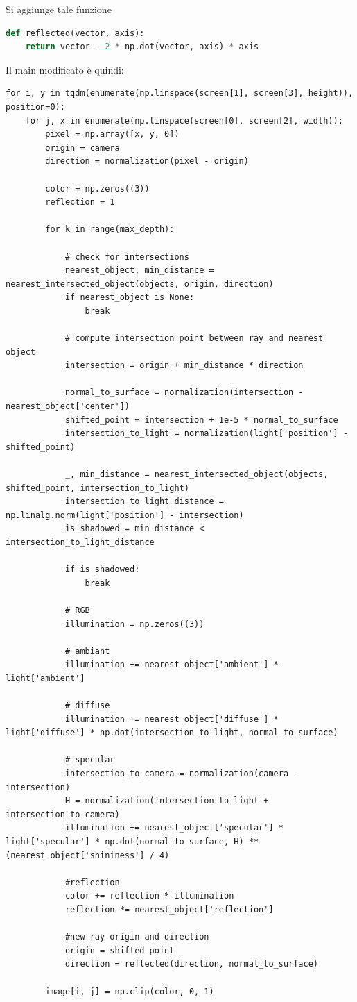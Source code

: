 \documentclass[9pt,a4paper,twoside]{tau}
\begin{document}
Si aggiunge tale funzione
\begin{lstlisting}[language=Python]
def reflected(vector, axis):
    return vector - 2 * np.dot(vector, axis) * axis
\end{lstlisting}
Il main modificato è quindi:
\begin{lstlisting}
for i, y in tqdm(enumerate(np.linspace(screen[1], screen[3], height)), position=0):
    for j, x in enumerate(np.linspace(screen[0], screen[2], width)):
        pixel = np.array([x, y, 0])
        origin = camera
        direction = normalization(pixel - origin)

        color = np.zeros((3))
        reflection = 1

        for k in range(max_depth):

            # check for intersections
            nearest_object, min_distance = nearest_intersected_object(objects, origin, direction)
            if nearest_object is None:
                break

            # compute intersection point between ray and nearest object
            intersection = origin + min_distance * direction

            normal_to_surface = normalization(intersection - nearest_object['center'])
            shifted_point = intersection + 1e-5 * normal_to_surface
            intersection_to_light = normalization(light['position'] - shifted_point)

            _, min_distance = nearest_intersected_object(objects, shifted_point, intersection_to_light)
            intersection_to_light_distance = np.linalg.norm(light['position'] - intersection)
            is_shadowed = min_distance < intersection_to_light_distance
            
            if is_shadowed:
                break

            # RGB
            illumination = np.zeros((3))

            # ambiant
            illumination += nearest_object['ambient'] * light['ambient']

            # diffuse
            illumination += nearest_object['diffuse'] * light['diffuse'] * np.dot(intersection_to_light, normal_to_surface)

            # specular
            intersection_to_camera = normalization(camera - intersection)
            H = normalization(intersection_to_light + intersection_to_camera)
            illumination += nearest_object['specular'] * light['specular'] * np.dot(normal_to_surface, H) ** (nearest_object['shininess'] / 4)

            #reflection
            color += reflection * illumination
            reflection *= nearest_object['reflection']

            #new ray origin and direction
            origin = shifted_point
            direction = reflected(direction, normal_to_surface)

        image[i, j] = np.clip(color, 0, 1)
\end{lstlisting}
\end{document}
